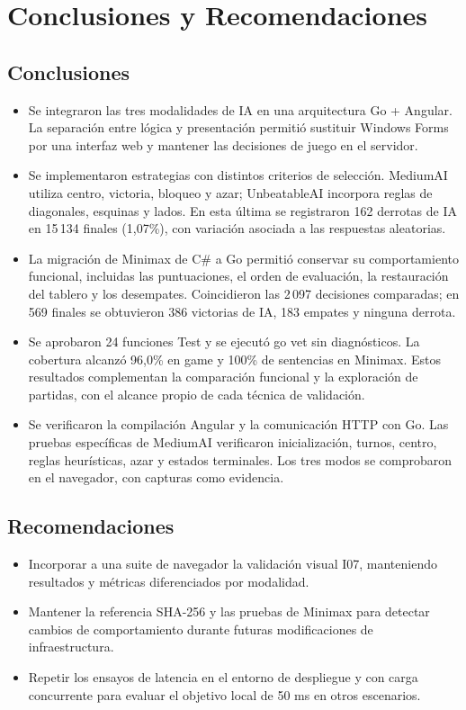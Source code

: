 \documentclass[12pt,a4paper]{article}
\begin{document}
\section{Conclusiones y Recomendaciones}
\subsection{Conclusiones}
\begin{itemize}
 \item Se integraron las tres modalidades de IA en una arquitectura Go + Angular.
       La separación entre lógica y presentación permitió sustituir Windows Forms
       por una interfaz web y mantener las decisiones de juego en el servidor.
 \item Se implementaron estrategias con distintos criterios de selección.
       MediumAI utiliza centro, victoria, bloqueo y azar; UnbeatableAI incorpora
       reglas de diagonales, esquinas y lados. En esta última se registraron
       162 derrotas de IA en 15\,134 finales (1,07\%), con variación asociada
       a las respuestas aleatorias.
 \item La migración de Minimax de C\# a Go permitió conservar su comportamiento
       funcional, incluidas las puntuaciones, el orden de evaluación, la
       restauración del tablero y los desempates. Coincidieron las 2\,097 decisiones
       comparadas; en 569 finales se obtuvieron 386 victorias de IA, 183 empates
       y ninguna derrota.
 \item Se aprobaron 24 funciones Test y se ejecutó go vet sin diagnósticos.
       La cobertura alcanzó 96,0\% en game y 100\% de sentencias en Minimax.
       Estos resultados complementan la comparación funcional y la exploración
       de partidas, con el alcance propio de cada técnica de validación.
 \item Se verificaron la compilación Angular y la comunicación HTTP con Go.
       Las pruebas espec\'ificas de MediumAI verificaron inicializaci\'on, turnos, centro,
       reglas heur\'isticas, azar y estados terminales. Los tres modos se
       comprobaron en el navegador, con capturas como evidencia.
\end{itemize}

\subsection{Recomendaciones}
\begin{itemize}
 \item Incorporar a una suite de navegador la validación visual I07,
       manteniendo resultados y métricas diferenciados por modalidad.
 \item Mantener la referencia SHA-256 y las pruebas de Minimax para detectar
       cambios de comportamiento durante futuras modificaciones de infraestructura.
 \item Repetir los ensayos de latencia en el entorno de despliegue y con carga
       concurrente para evaluar el objetivo local de 50 ms en otros escenarios.
\end{itemize}
\end{document}
